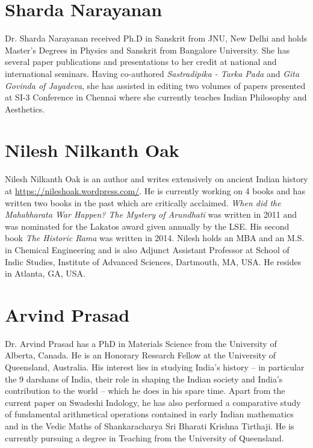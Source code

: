 \section*{Sharda Narayanan}

Dr. Sharda Narayanan received Ph.D in Sanskrit from JNU, New Delhi and holds Master's Degrees in Physics and Sanskrit from Bangalore University. She has several paper publications and presentations to her credit at national and international seminars. Having co-authored \textit{Sastradipika - Tarka Pada} and \textit{Gita Govinda of Jayadeva}, she has assisted in editing two volumes of papers presented at SI-3 Conference in Chennai where she currently teaches Indian Philosophy and Aesthetics.


\section*{Nilesh Nilkanth Oak}

Nilesh Nilkanth Oak is an author and writes extensively on ancient Indian history at \url{https://nileshoak.wordpress.com/}. He is currently working on 4 books and has written two books in the past which are critically acclaimed. \textit{When did the Mahabharata War Happen? The Mystery of Arundhati} was written in 2011 and was nominated for the Lakatos award given annually by the LSE. His second book \textit{The Historic Rama }was written in 2014. Nilesh holds an MBA and an M.S. in Chemical Engineering and is also Adjunct Assistant Professor at School of Indic Studies, Institute of Advanced Sciences, Dartmouth, MA, USA. He resides in Atlanta, GA, USA.


\section*{Arvind Prasad}

Dr. Arvind Prasad has a PhD in Materials Science from the University of Alberta, Canada. He is an Honorary Research Fellow at the University of Queensland, Australia. His interest lies in studying India’s history – in particular the 9 darshans of India, their role in shaping the Indian society and India’s contribution to the world – which he does in his spare time. Apart from the current paper on Swadeshi Indology, he has also performed a comparative study of fundamental arithmetical operations contained in early Indian mathematics and in the Vedic Maths of Shankaracharya Sri Bharati Krishna Tirthaji. He is currently pursuing a degree in Teaching from the University of Queensland.



